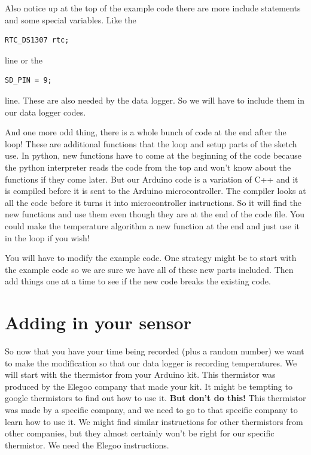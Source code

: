 Also notice up at the top of the example code there are more include statements and some special variables.  Like the 

 \begin{lstlisting}[language=Arduino]
	RTC_DS1307 rtc;
\end{lstlisting}
line or the 
 \begin{lstlisting}[language=Arduino]
	SD_PIN = 9; 
\end{lstlisting}

\noindent line. These are also needed by the data logger. So we will have to include them in our data logger codes. 

And one more odd thing, there is a whole bunch of code at the end after the loop! These are additional functions that the loop and setup parts of the sketch use.  In python, new functions have to come at the beginning of the code because the python interpreter reads the code from the top and won't know about the functions if they come later. But our Arduino code is a variation of C++ and it is compiled before it is sent to the Arduino microcontroller. The compiler looks at all the code before it turns it into microcontroller instructions. So it will find the new functions and use them even though they are at the end of the code file.  You could make the temperature algorithm a new function at the end and just use it in the loop if you wish!

You will have to modify the example code. One strategy might be to start with the example code so we are sure we have all of these new parts included. Then add things one at a time to see if the new code breaks the existing code. 

\section{Adding in your sensor}
So now that you have your time being recorded (plus a random number) we want to make the modification so that our data logger is recording temperatures.  We will start with the thermistor from your Arduino kit. This thermistor was produced by the Elegoo company that made your kit.  It might be tempting to google thermistors to find out how to use it. \textbf{But don't do this! } This thermistor was made by a specific company, and we need to go to that specific company to learn how to use it.  We might find similar instructions for other thermistors from other companies, but they almost certainly won't be right for our specific thermistor.  We need the Elegoo instructions. 

